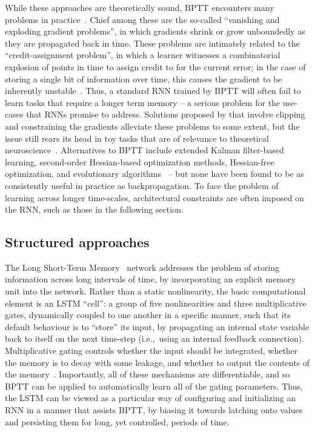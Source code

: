 While these approaches are theoretically sound, BPTT encounters many problems in practice~\citep{bengio1994learning}.
Chief among these are the so-called ``vanishing and exploding gradient problems'', in which gradients shrink or grow unboundedly as they are propagated back in time.
These problems are intimately related to the ``credit-assignment problem'', in which a learner witnesses a combinatorial explosion of points in time to assign credit to for the current error; in the case of storing a single bit of information over time, this causes the gradient to be inherently unstable~\citep{bengio1994credit}.
Thus, a standard RNN trained by BPTT will often fail to learn tasks that require a longer term memory -- a serious problem for the use-cases that RNNs promise to address.
Solutions proposed by \citet{pascanu2013difficulty} that involve clipping and constraining the gradients alleviate these problems to some extent, but the issue still rears its head in toy tasks that are of relevance to theoretical neuroscience~\citep{depasquale2018full}.
Alternatives to BPTT include extended Kalman filter-based learning, second-order Hessian-based optimization methods, Hessian-free optimization, and evolutionary algorithms~\citep{salehinejad2017recent} -- but none have been found to be as consistently useful in practice as backpropagation.
To face the problem of learning across longer time-scales, architectural constraints are often imposed on the RNN, such as those in the following section.

\subsection{Structured approaches}

The Long Short-Term Memory~\citep[LSTM;][]{hochreiter1997long} network addresses the problem of storing information across long intervals of time, by incorporating an explicit memory unit into the network.
Rather than a static nonlinearity, the basic computational element is an LSTM ``cell'': a group of five nonlinearities and three multiplicative gates, dynamically coupled to one another in a specific manner, such that its default behaviour is to ``store'' its input, by propagating an internal state variable back to itself on the next time-step (i.e.,~using an internal feedback connection).
Multiplicative gating controls whether the input should be integrated, whether the memory is to decay with some leakage, and whether to output the contents of the memory~\citep{gers1999learning}.
Importantly, all of these mechanisms are differentiable, and so BPTT can be applied to automatically learn all of the gating parameters.
Thus, the LSTM can be viewed as a particular way of configuring and initializing an RNN in a manner that assists BPTT, by biasing it towards latching onto values and persisting them for long, yet controlled, periods of time.

